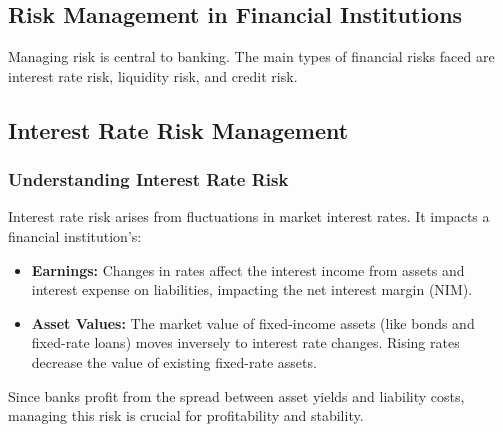 \subsection{Risk Management in Financial Institutions}

Managing risk is central to banking. The main types of financial risks faced are interest rate risk, liquidity risk, and credit risk.

\subsection{Interest Rate Risk Management}

\subsubsection{Understanding Interest Rate Risk}
Interest rate risk arises from fluctuations in market interest rates. It impacts a financial institution's:
\begin{itemize}
    \item \textbf{Earnings:} Changes in rates affect the interest income from assets and interest expense on liabilities, impacting the net interest margin (NIM).
    \item \textbf{Asset Values:} The market value of fixed-income assets (like bonds and fixed-rate loans) moves inversely to interest rate changes. Rising rates decrease the value of existing fixed-rate assets.
\end{itemize}
Since banks profit from the spread between asset yields and liability costs, managing this risk is crucial for profitability and stability.


